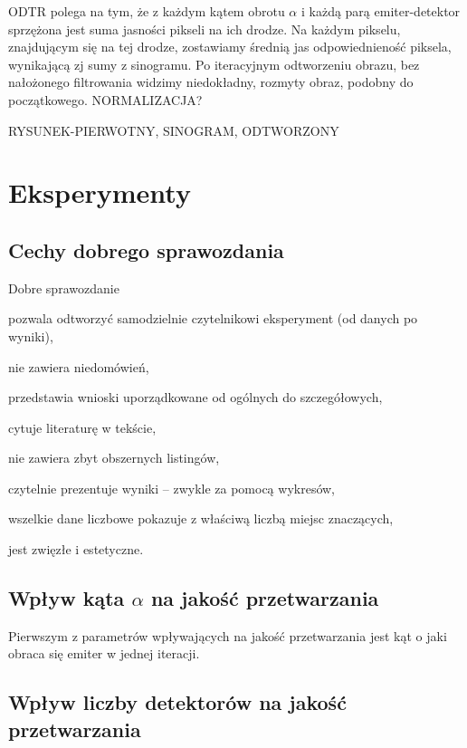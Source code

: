 \documentclass{article}
\begin{document}
ODTR polega na tym, że z każdym kątem obrotu $\alpha$ i każdą parą emiter-detektor sprzężona jest suma jasności pikseli na ich drodze. Na każdym pikselu, znajdującym się na tej drodze, zostawiamy średnią jas odpowiednieność piksela, wynikającą zj sumy z sinogramu. Po iteracyjnym odtworzeniu obrazu, bez nałożonego filtrowania widzimy niedokładny, rozmyty obraz, podobny do początkowego. NORMALIZACJA? 

RYSUNEK-PIERWOTNY, SINOGRAM, ODTWORZONY

\clearpage %


\section{Eksperymenty}
\label{sec-eksperymenty}


\subsection{Cechy dobrego sprawozdania}



Dobre sprawozdanie
\begin{tightlist}
\item pozwala odtworzyć samodzielnie czytelnikowi eksperyment (od danych po wyniki),
\item nie zawiera niedomówień,
\item przedstawia wnioski uporządkowane od ogólnych do szczegółowych,
\item cytuje literaturę w tekście,
\item nie zawiera zbyt obszernych listingów,
\item czytelnie prezentuje wyniki -- zwykle za pomocą wykresów,
\item wszelkie dane liczbowe pokazuje z właściwą liczbą miejsc znaczących,
\item jest zwięzłe i estetyczne.
\end{tightlist}


\subsection{Wpływ kąta $\alpha$ na jakość przetwarzania}

Pierwszym z parametrów wpływających na jakość przetwarzania jest kąt o jaki obraca się emiter w jednej iteracji. 


\subsection{Wpływ liczby detektorów na jakość przetwarzania}
\end{document}
